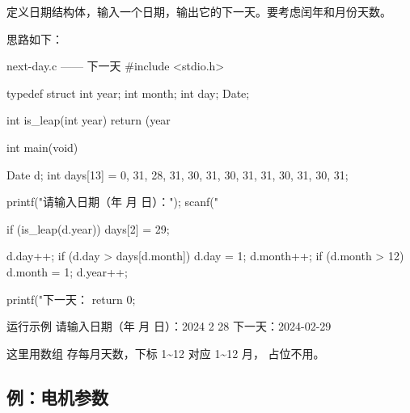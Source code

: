 \begin{example}
定义日期结构体，输入一个日期，输出它的下一天。要考虑闰年和月份天数。
\end{example}
\begin{solution}
思路如下：

\begin{codebox}{next-day.c —— 下一天}
#include <stdio.h>

typedef struct {
    int year;
    int month;
    int day;
} Date;

int is_leap(int year)
{
    return (year %
}

int main(void)
{
    Date d;
    int days[13] = {0, 31, 28, 31, 30, 31, 30, 31, 31, 30, 31, 30, 31};

    printf("请输入日期（年 月 日）：");
    scanf("%

    if (is_leap(d.year)) {
        days[2] = 29;
    }

    d.day++;
    if (d.day > days[d.month]) {
        d.day = 1;
        d.month++;
        if (d.month > 12) {
            d.month = 1;
            d.year++;
        }
    }

    printf("下一天：%
    return 0;
}
\end{codebox}

\begin{outbox}{运行示例}
请输入日期（年 月 日）：2024 2 28
下一天：2024-02-29
\end{outbox}

这里用数组  存每月天数，下标 1\textasciitilde12 对应 1\textasciitilde12 月， 占位不用。
\end{solution}

\subsection{例：电机参数}

